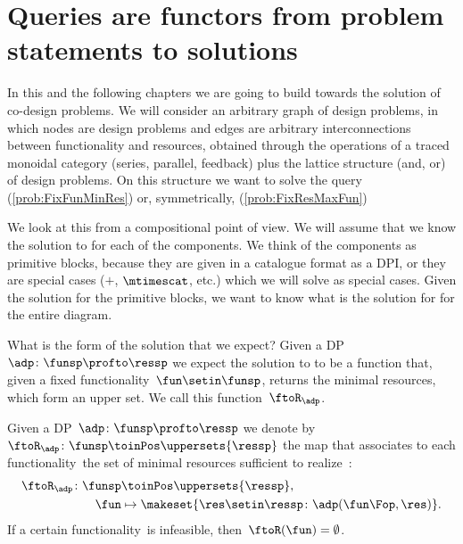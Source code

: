 \section{Queries are functors from problem statements to solutions}

In this and the following chapters we are going to build towards the solution of co-design problems.
We will consider an arbitrary graph of design problems, in which nodes are design problems and edges are arbitrary interconnections between functionality and resources, obtained through the operations of a traced monoidal category (series, parallel, feedback) plus the lattice structure (and, or) of design problems.
On this structure we want to solve the query \FixFunMinRes (\cref{prob:FixFunMinRes}) or, symmetrically, \FixResMaxFun (\cref{prob:FixResMaxFun})

We look at this from a compositional point of view.
We will assume that we know the solution to \FixFunMinRes for each of the components.
We think of the components as primitive blocks, because they are given in a catalogue format as a DPI, or they are special cases ($+$, $\mtimescat$, etc.) which we will solve as special cases.
Given the solution for the primitive blocks, we want to know what is the solution for \FixFunMinRes for the entire diagram.

What is the form of the solution that we expect?
Given a DP~$\adp\colon \funsp \profto \ressp$ we expect the solution to \FixFunMinRes to be a function that, given a fixed functionality~$\fun\setin\funsp$, returns the minimal resources, which form an upper set.
We call this function~$\ftoR_\adp$.

\begin{definition}
    \label{def:ftoR-dp}
    Given a DP~$\adp\colon\funsp\profto\ressp$ we denote by~$\ftoR_{\adp}\colon \funsp\toinPos \uppersets{\ressp}$ the map that associates to each functionality~\fun the set of minimal resources sufficient to realize~\fun:
    \begin{equation*}
        \begin{aligned}
            \ftoR_{\adp}\colon \funsp & \toinPos \uppersets{\ressp}, \\
            \fun                      & \mapsto \makeset{ \res \setin \ressp \colon \adp(\fun\Fop, \res)}.
        \end{aligned}
    \end{equation*}
    If a certain functionality~\fun is infeasible, then~$\ftoR(\fun)=\emptyset$.
\end{definition}

